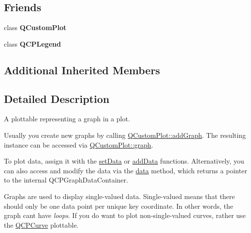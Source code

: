 \subsection*{Friends}
\begin{DoxyCompactItemize}
\item 
\mbox{\label{class_q_c_p_graph_a1cdf9df76adcfae45261690aa0ca2198}} 
class {\bfseries Q\+Custom\+Plot}
\item 
\mbox{\label{class_q_c_p_graph_a8429035e7adfbd7f05805a6530ad5e3b}} 
class {\bfseries Q\+C\+P\+Legend}
\end{DoxyCompactItemize}
\subsection*{Additional Inherited Members}


\subsection{Detailed Description}
A plottable representing a graph in a plot. 



Usually you create new graphs by calling \hyperlink{class_q_custom_plot_a6fb2873d35a8a8089842d81a70a54167}{Q\+Custom\+Plot\+::add\+Graph}. The resulting instance can be accessed via \hyperlink{class_q_custom_plot_a6ecae130f684b25276fb47bd3a5875c6}{Q\+Custom\+Plot\+::graph}.

To plot data, assign it with the \hyperlink{class_q_c_p_graph_a1eae9429a316b008e2d99b2d65a54395}{set\+Data} or \hyperlink{class_q_c_p_graph_ae0555c0d3fe0fa7cb8628f88158d420f}{add\+Data} functions. Alternatively, you can also access and modify the data via the \hyperlink{class_q_c_p_graph_a141aa31a1f19bbd0ce60f55eaeb9ea60}{data} method, which returns a pointer to the internal Q\+C\+P\+Graph\+Data\+Container.

Graphs are used to display single-\/valued data. Single-\/valued means that there should only be one data point per unique key coordinate. In other words, the graph can\textquotesingle{}t have {\itshape loops}. If you do want to plot non-\/single-\/valued curves, rather use the \hyperlink{class_q_c_p_curve}{Q\+C\+P\+Curve} plottable.

